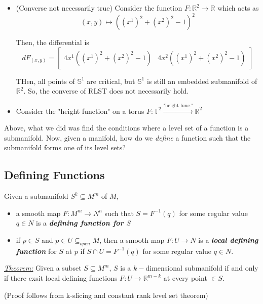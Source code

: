 \documentclass{article}
\newcommand{\R}{\mathbb{R}}
\begin{document}
\begin{itemize}
  \vskip 0.5cm
  \item (Converse not necessarily true) Consider the function $F : \R^2 \rightarrow \R$ which acts as 
  \[ (x, y) \mapsto \left( (x^1)^2  + (x^2)^2 - 1 \right)^2 \]

  Then, the differential is 
  \[ dF_{(x, y)} = \begin{bmatrix}
    4x^1\left( (x^1)^2 + (x^2)^2 - 1 \right) & 4x^2\left( (x^1)^2 + (x^2)^2 - 1 \right)
  \end{bmatrix} \]

  THen, all points of $\mathbb{S}^1$ are critical, but $\mathbb{S}^1$ is still an embedded submanifold of $\R^2$. So, the converse of RLST does not necessarily hold.

  \vskip 0.5cm
  \item Consider the "height function" on a torus $F : \mathbb{T}^2 \xrightarrow{\text{"height func."}} \R^2$
\end{itemize}

\vskip 0.5cm
Above, what we did was find the conditions where a level set of a function is a submanifold. Now, given a manifold, how do we \emph{define} a function such that the submanifold forms one of its level sets?

\vskip 1cm
\subsection{Defining Functions}


\begin{mathdefinitionbox}{}
  Given a submanifold $S^k \subseteq M^m$ of $M$, 
  \begin{itemize}
    \item a smooth map $F : M^m \rightarrow N^n$ such that $S = F^{-1}(q)$ for some regular value $q \in N$ is a \emph{\textbf{defining function for $S$}} 
    \item if $p \in S$ and $p \in U \subseteq_{open} M$, then a smooth map $F : U \rightarrow N$ is a \emph{\textbf{local defining function}} for $S$ at $p$ if $S \cap U = F^{-1}(q)$ for some regular value $q \in N$.
  \end{itemize}
\end{mathdefinitionbox}

\vskip 0.5cm
\begin{dottedbox}
  \underline{\emph{Theorem:}} Given a subset $S \subseteq M^m$, $S$ is a $k-$dimensional submanifold if and only if there exsit local defining functions $F : U \rightarrow \R^{m-k}$ at every point $\in S$.

  \vskip 0.5cm
  (Proof follows from k-slicing and constant rank level set theorem)
\end{dottedbox}
\end{document}
